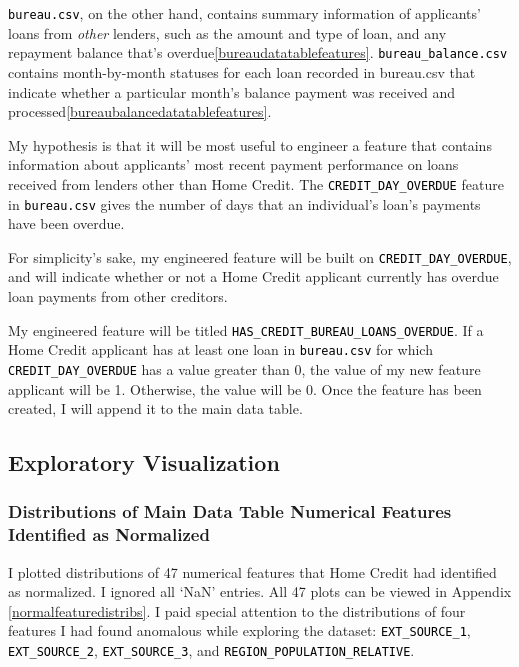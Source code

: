 \documentclass[12pt, letterpaper]{article}
\begin{document}
\colorbox{backcolor}{\textcolor{black}{\texttt{bureau.csv}}}, on the other hand, contains summary information of applicants' loans from \textit{other} lenders, such as the amount and type of loan, and any repayment balance that's overdue\ref{bureaudatatablefeatures}. \colorbox{backcolor}{\textcolor{black}{\texttt{bureau_balance.csv}}} contains month-by-month statuses for each loan recorded in bureau.csv that indicate whether a particular month's balance payment was received and processed\ref{bureaubalancedatatablefeatures}.

My hypothesis is that it will be most useful to engineer a feature that contains information about applicants' most recent payment performance on loans received from lenders other than Home Credit. The \colorbox{backcolor}{\textcolor{black}{\texttt{CREDIT_DAY_OVERDUE}}} feature in \colorbox{backcolor}{\textcolor{black}{\texttt{bureau.csv}}} gives the number of days that an individual's loan's payments have been overdue.

For simplicity's sake, my engineered feature will be built on \colorbox{backcolor}{\textcolor{black}{\texttt{CREDIT_DAY_OVERDUE}}}, and will indicate whether or not a Home Credit applicant currently has overdue loan payments from other creditors.

My engineered feature will be titled \colorbox{backcolor}{\textcolor{black}{\texttt{HAS_CREDIT_BUREAU_LOANS_OVERDUE}}}. If a Home Credit applicant has at least one loan in \colorbox{backcolor}{\textcolor{black}{\texttt{bureau.csv}}} for which \colorbox{backcolor}{\textcolor{black}{\texttt{CREDIT_DAY_OVERDUE}}} has a value greater than 0, the value of my new feature applicant will be 1. Otherwise, the value will be 0. Once the feature has been created, I will append it to the main data table.

\subsection{Exploratory Visualization}
\subsubsection{Distributions of Main Data Table Numerical Features Identified as Normalized}
I plotted distributions of 47 numerical features that Home Credit had identified as normalized. I ignored all `NaN' entries. All 47 plots can be viewed in Appendix \ref{normalfeaturedistribs}. I paid special attention to the distributions of four features I had found anomalous while exploring the dataset: \colorbox{backcolor}{\textcolor{black}{\texttt{EXT_SOURCE_1}}}, \colorbox{backcolor}{\textcolor{black}{\texttt{EXT_SOURCE_2}}}, \colorbox{backcolor}{\textcolor{black}{\texttt{EXT_SOURCE_3}}}, and \colorbox{backcolor}{\textcolor{black}{\texttt{REGION_POPULATION_RELATIVE}}}.
\end{document}
